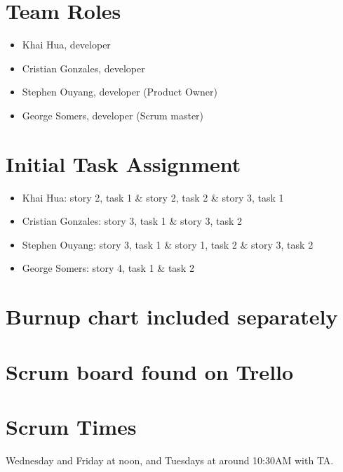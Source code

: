\documentclass[11pt]{article}
\begin{document}
	\section{Team Roles}
		\vspace{-3mm}
		\begin{itemize}
		    \item Khai Hua, developer
		    \item Cristian Gonzales, developer
		    \item Stephen Ouyang, developer (Product Owner)
		    \item George Somers, developer (Scrum master)
		\end{itemize}
	\section{Initial Task Assignment}
	    \vspace{-3mm}
	    \begin{itemize}
		    \item Khai Hua: story 2, task 1 \& story 2, task 2 \& story 3, task 1
		    \item Cristian Gonzales: story 3, task 1 \& story 3, task 2
		    \item Stephen Ouyang: story 3, task 1 \& story 1, task 2 \& story 3, task 2
		    \item George Somers: story 4, task 1 \& task 2
		\end{itemize}
	\section{Burnup chart included separately}
	\section{Scrum board found on Trello}
	\section{Scrum Times}
	    Wednesday and Friday at noon, and Tuesdays at around 10:30AM with TA.
\end{document}
